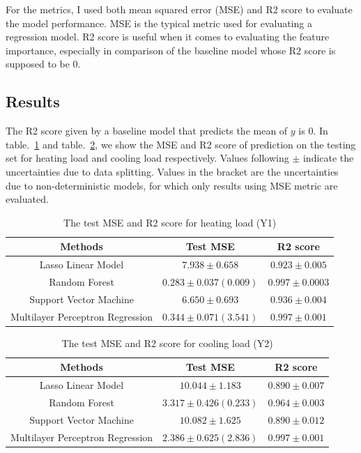 \documentclass{article}
\begin{document}
For the metrics, I used both mean squared error (MSE) and R2 score to evaluate the model performance. MSE is the typical metric used for evaluating a regression model. R2 score is useful when it comes to evaluating the feature importance, especially in comparison of the baseline model whose R2 score is supposed to be $0$.

\subsection{Results}
The R2 score given by a baseline model that predicts the mean of $y$ is $0$.
In table.~\ref{tab:results_heating_load} and  table.~\ref{tab:results_cooling_load}, we show the MSE and R2 score of prediction on the testing set for heating load and cooling load respectively. Values following $\pm$ indicate the uncertainties due to data splitting. Values in the bracket are the uncertainties due to non-deterministic models, for which only results using MSE metric are evaluated. 

\begin{table}[!htbp]
\centering 
\captionsetup{font=footnotesize}
\caption{The test MSE and R2 score for heating load (Y1)}
 \begin{tabular}{*{3}c}
\hline \hline
Methods & Test MSE & R2 score  \\
\hline
Lasso Linear Model & $7.938 \pm 0.658$ &   $0.923 \pm 0.005$   \\
Random Forest & $0.283 \pm 0.037 (0.009)$ & $0.997 \pm 0.0003$ \\
Support Vector Machine  &  $6.650 \pm 0.693$  &   $0.936 \pm 0.004$   \\
Multilayer Perceptron Regression  &  $0.344\pm0.071 (3.541)$  &   $0.997 \pm 0.001$   \\
\hline \hline
\end{tabular}
\label{tab:results_heating_load}
\end{table}

\begin{table}[!htbp]
\centering 
\captionsetup{font=footnotesize}
\caption{The test MSE and R2 score for cooling load (Y2)}
 \begin{tabular}{*{3}c}
\hline \hline
Methods & Test MSE & R2 score  \\
\hline
Lasso Linear Model & $10.044 \pm 1.183$ &   $0.890 \pm 0.007$   \\
Random Forest & $3.317 \pm 0.426 (0.233)$ & $0.964 \pm 0.003$ \\
Support Vector Machine  &  $10.082 \pm 1.625$  &   $0.890 \pm 0.012$   \\
Multilayer Perceptron Regression  &  $2.386\pm0.625 (2.836)$  &   $0.997 \pm 0.001$   \\
\hline \hline
\end{tabular}
\label{tab:results_cooling_load}
\end{table}
\end{document}
